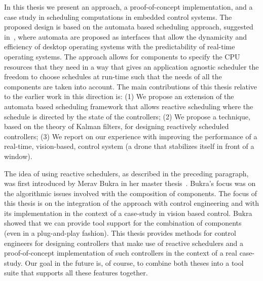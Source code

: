 \documentclass[ twoside, 12pt ]{article}
\begin{document}
In this thesis we present an approach, a proof-of-concept implementation, and a case study in scheduling computations in embedded control systems. The proposed design is based on the automata based scheduling approach, suggested in~\cite{weiss2007automata,RTComposer,AW08,ESNAASHARI20102410,liu2013synthesis}, where automata are proposed as interfaces that allow the dynamicity and efficiency of desktop operating systems with the predictability of real-time operating systems. The approach allows for components to specify the CPU resources that they need in a way that gives an application agnostic scheduler the freedom to choose schedules at run-time such that the needs of all the components are taken into account.
The main contributions of this thesis relative to the earlier work in this direction is: (1) We propose an extension of the automata based scheduling framework that allows reactive scheduling where the schedule is directed by the state of the controllers; (2) We propose a technique, based on the theory of Kalman filters, for designing reactively scheduled controllers; (3) We report on our experience with improving the performance of a real-time, vision-based, control system (a drone that stabilizes itself in front of a window).

The idea of using reactive schedulers, as described in the preceding paragraph, was first introduced by Merav Bukra in her master thesis~\cite{Merav}. Bukra's focus was on the algorithmic issues involved with the composition of components. The focus of this thesis is on the integration of the approach with control engineering and with its implementation in the context of a case-study in vision based control. Bukra showed that we can provide tool support for the combination of components (even in a plug-and-play fashion). This thesis provides methods for control engineers for designing controllers that make use of reactive schedulers and a proof-of-concept implementation of such controllers in the context of a real case-study. Our goal in the future is, of course, to combine both theses into a tool suite that supports all these features together.

 
\end{document}
